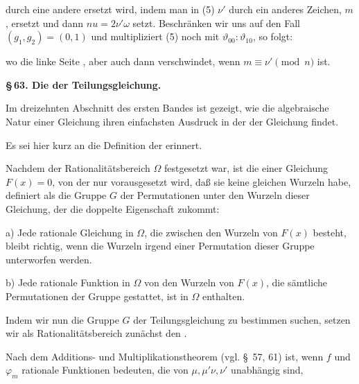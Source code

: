 durch eine andere ersetzt wird, indem man in (5) $\nu'$ durch ein anderes Zeichen, $m$, ersetzt und dann $nu = 2\nu'\omega$ setzt. Beschränken wir uns auf den Fall $(g_1, g_2) = (0, 1)$ und multipliziert (5) noch mit $\vartheta_{00} : \vartheta_{10}$, so folgt: %


wo die linke Seite , aber auch  dann verschwindet, wenn $m \equiv \nu' \pmod{n}$ ist.

\medskip

\begin{center}
\textbf{\S\,63. Die  der Teilungsgleichung.}
\end{center}

Im dreizehnten Abschnitt des ersten Bandes ist gezeigt, wie die algebraische Natur einer Gleichung ihren einfachsten Ausdruck in der  der Gleichung findet.

Es sei hier kurz an die Definition der  erinnert.

Nachdem der Rationalitätsbereich $\Omega$ festgesetzt war, ist die  einer Gleichung $F(x) = 0$, von der nur vorausgesetzt wird, daß sie keine gleichen Wurzeln habe, definiert als die Gruppe $G$ der Permutationen unter den Wurzeln dieser Gleichung, der die doppelte Eigenschaft zukommt:

a) Jede rationale Gleichung in $\Omega$, die zwischen den Wurzeln von $F(x)$ besteht, bleibt richtig, wenn die Wurzeln irgend einer Permutation dieser Gruppe unterworfen werden.

b) Jede rationale Funktion in $\Omega$ von den Wurzeln von $F(x)$, die sämtliche Permutationen der Gruppe gestattet, ist in $\Omega$ enthalten.

Indem wir nun die Gruppe $G$ der Teilungsgleichung zu bestimmen suchen, setzen wir als Rationalitätsbereich zunächst den .

Nach dem Additions- und Multiplikationstheorem (vgl. \S\, 57, 61) ist, wenn $f$ und $\varphi_m$ rationale Funktionen bedeuten, die von $\mu, \mu' \nu, \nu'$ unabhängig sind, %


